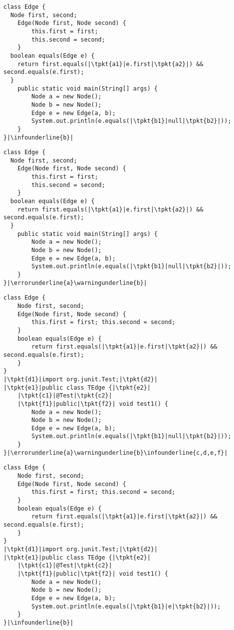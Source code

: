\newsavebox{\codetwo}
\begin{lrbox}{\codetwo}
\begin{lstlisting}
class Edge {
  Node first, second;
	Edge(Node first, Node second) {
		this.first = first;
		this.second = second;
	}
  boolean equals(Edge e) {
    return first.equals(|\tpkt{a1}|e.first|\tpkt{a2}|) && second.equals(e.first);
  }
	public static void main(String[] args) {
		Node a = new Node();
		Node b = new Node();
		Edge e = new Edge(a, b);
		System.out.println(e.equals(|\tpkt{b1}|null|\tpkt{b2}|));
	}
}|\infounderline{b}|
\end{lstlisting}
\end{lrbox}

\newsavebox{\bugtwo}
\begin{lrbox}{\bugtwo}
\begin{lstlisting}
class Edge {
  Node first, second;
	Edge(Node first, Node second) {
		this.first = first;
		this.second = second;
	}
  boolean equals(Edge e) {
    return first.equals(|\tpkt{a1}|e.first|\tpkt{a2}|) && second.equals(e.first);
  }
	public static void main(String[] args) {
		Node a = new Node();
		Node b = new Node();
		Edge e = new Edge(a, b);
		System.out.println(e.equals(|\tpkt{b1}|null|\tpkt{b2}|));
	}
}|\errorunderline{a}\warningunderline{b}|
\end{lstlisting}
\end{lrbox}

\newsavebox{\bugtwoagain}
\begin{lrbox}{\bugtwoagain}
\begin{lstlisting}
class Edge {
	Node first, second;
	Edge(Node first, Node second) {
		this.first = first; this.second = second;
	}
	boolean equals(Edge e) {
		return first.equals(|\tpkt{a1}|e.first|\tpkt{a2}|) && second.equals(e.first);
	}
}
|\tpkt{d1}|import org.junit.Test;|\tpkt{d2}|
|\tpkt{e1}|public class TEdge {|\tpkt{e2}|
	|\tpkt{c1}|@Test|\tpkt{c2}|
	|\tpkt{f1}|public|\tpkt{f2}| void test1() {
		Node a = new Node();
		Node b = new Node();
		Edge e = new Edge(a, b);
		System.out.println(e.equals(|\tpkt{b1}|null|\tpkt{b2}|));
	}
}|\errorunderline{a}\warningunderline{b}\infounderline{c,d,e,f}|
\end{lstlisting}
\end{lrbox}

\newsavebox{\codethree}
\begin{lrbox}{\codethree}
\begin{lstlisting}
class Edge {
	Node first, second;
	Edge(Node first, Node second) {
		this.first = first; this.second = second;
	}
	boolean equals(Edge e) {
		return first.equals(|\tpkt{a1}|e.first|\tpkt{a2}|) && second.equals(e.first);
	}
}
|\tpkt{d1}|import org.junit.Test;|\tpkt{d2}|
|\tpkt{e1}|public class TEdge {|\tpkt{e2}|
	|\tpkt{c1}|@Test|\tpkt{c2}|
	|\tpkt{f1}|public|\tpkt{f2}| void test1() {
		Node a = new Node();
		Node b = new Node();
		Edge e = new Edge(a, b);
		System.out.println(e.equals(|\tpkt{b1}|e|\tpkt{b2}|));
	}
}|\infounderline{b}|
\end{lstlisting}
\end{lrbox}


